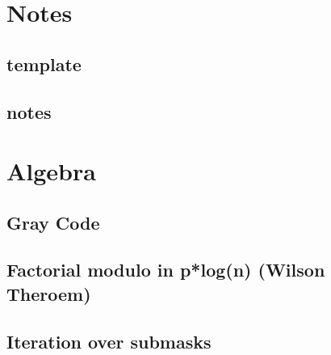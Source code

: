\section{Notes}
\vspace{-1ex}
\subsection{template}
\vspace{-2.3ex}
\raggedbottom
\vspace{-3.3ex}
\hrulefill
\vspace{-1ex}
\subsection{notes}
\vspace{-2.3ex}
\raggedbottom
\vspace{-3.3ex}
\hrulefill

\section{Algebra}
\vspace{-1ex}
\subsection{Gray Code}
\vspace{-2.3ex}
\raggedbottom
\vspace{-3.3ex}
\hrulefill
\vspace{-1ex}
\subsection{Factorial modulo in p*log(n) (Wilson Theroem)}
\vspace{-2.3ex}
\raggedbottom
\vspace{-3.3ex}
\hrulefill
\vspace{-1ex}
\subsection{Iteration over submasks}
\vspace{-2.3ex}
\raggedbottom
\vspace{-3.3ex}
\hrulefill
\vspace{-1ex}
